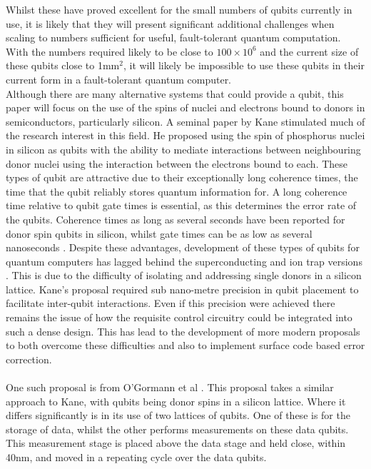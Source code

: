 Whilst these have proved excellent for the small numbers of qubits currently in use, it is likely that they will present significant additional challenges when scaling to numbers sufficient for useful, fault-tolerant quantum computation.
With the numbers required likely to be close to $100 \times 10^6$ and the current size of these qubits close to 1mm$^2$, it will likely be impossible to use these qubits in their current form in a fault-tolerant quantum computer.
\\
Although there are many alternative systems that could provide a qubit, this paper will focus on the use of the spins of nuclei and electrons bound to donors in semiconductors, particularly silicon.
A seminal paper by Kane \cite{Kane1998} stimulated much of the research interest in this field.
He proposed using the spin of phosphorus nuclei in silicon as qubits with the ability to mediate interactions between neighbouring donor nuclei using the interaction between the electrons bound to each.
These types of qubit are attractive due to their exceptionally long coherence times, the time that the qubit reliably stores quantum information for. 
A long coherence time relative to qubit gate times is essential, as this determines the error rate of the qubits.
Coherence times as long as several seconds have been reported for donor spin qubits in silicon, whilst gate times can be as low as several nanoseconds \cite{Wolfowicz2013}. 
Despite these advantages, development of these types of qubits for quantum computers has lagged behind the superconducting and ion trap versions \cite{Ballance2015}. 
This is due to the difficulty of isolating and addressing single donors in a silicon lattice. 
Kane's proposal required sub nano-metre precision in qubit placement to facilitate inter-qubit interactions. 
Even if this precision were achieved there remains the issue of how the requisite control circuitry could be integrated into such a dense design.
This has lead to the development of more modern proposals to both overcome these difficulties and also to implement surface code based error correction.
\\
\\
One such proposal is from O'Gormann et al \cite{OGorman2014}. 
This proposal takes a similar approach to Kane, with qubits being donor spins in a silicon lattice. 
Where it differs significantly is in its use of two lattices of qubits. 
One of these is for the storage of data, whilst the other performs measurements on these data qubits. 
This measurement stage is placed above the data stage and held close, within 40nm, and moved in a repeating cycle over the data qubits.

